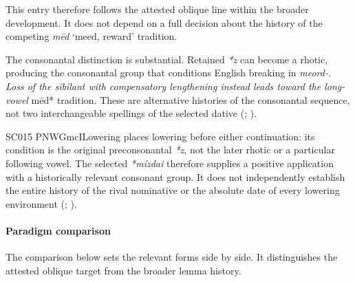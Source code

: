 \documentclass[
  british,
  a4paper,
]{article}
\begin{document}
This entry therefore follows the attested oblique line within the
broader development. It does not depend on a full decision about the
history of the competing {\emph{mēd}} `meed, reward' tradition.

The consonantal distinction is substantial. Retained \emph{*z} can
become a rhotic, producing the consonantal group that conditions English
breaking in \emph{meord-. Loss of the sibilant with compensatory
lengthening instead leads toward the long-vowel }mēd* tradition. These
are alternative histories of the consonantal sequence, not two
interchangeable spellings of the selected dative
(;
).

SC015 PNWGmcILowering places lowering before either continuation: its
condition is the original preconsonantal \emph{*z}, not the later rhotic
or a particular following vowel. The selected \emph{*mízdai} therefore
supplies a positive application with a historically relevant consonant
group. It does not independently establish the entire history of the
rival nominative or the absolute date of every lowering environment
(; ).

\paragraph{Paradigm comparison}\label{paradigm-comparison-16}

The comparison below sets the relevant forms side by side. It
distinguishes the attested oblique target from the broader lemma
history.
\end{document}
